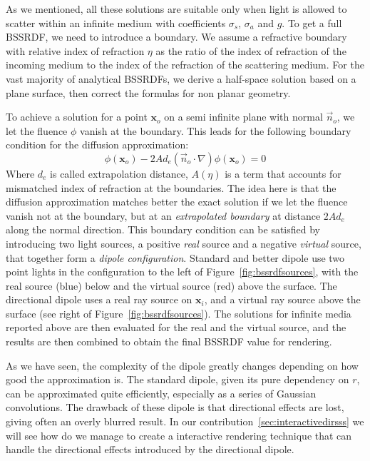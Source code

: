 %
As we mentioned, all these solutions are suitable only when light is allowed to scatter within an infinite medium with coefficients $\sigma_s$, $\sigma_a$ and $g$. To get a full BSSRDF, we need to introduce a boundary. We assume a refractive boundary with relative index of refraction $\eta$ as the ratio of the index of refraction of the incoming medium to the index of the refraction of the scattering medium. For the vast majority of analytical BSSRDFs, we derive a half-space solution based on a plane surface, then correct the formulas for non planar geometry.

To achieve a solution for a point $\mathbf{x}_o$ on a semi infinite plane with normal $\vec{n}_o$, we let the fluence $\phi$ vanish at the boundary. This leads for the following boundary condition for the diffusion approximation: 
\begin{equation*}
\phi(\mathbf{x}_o) - 2 A d_e (\vec{n}_o \cdot \nabla) \phi(\mathbf{x}_o) = 0
\end{equation*}
Where $d_e$ is called extrapolation distance, $A(\eta)$ is a term that accounts for mismatched index of refraction at the boundaries. The idea here is that the diffusion approximation matches better the exact solution if we let the fluence vanish not at the boundary, but at an \emph{extrapolated boundary} at distance $2 A d_e$ along the normal direction. This boundary condition can be satisfied by introducing two light sources, a positive \emph{real} source and a negative \emph{virtual} source, that together form a \emph{dipole configuration}.  Standard and better dipole use two point lights in the configuration to the left of Figure~\ref{fig:bssrdfsources}, with the real source (blue) below and the virtual source (red) above the surface. The directional dipole uses a real ray source on $\mathbf{x}_i$, and a virtual ray source above the surface (see right of Figure~\ref{fig:bssrdfsources}). The solutions for infinite media reported above are then evaluated for the real and the virtual source, and the results are then combined to obtain the final BSSRDF value for rendering. 

As we have seen, the complexity of the dipole greatly changes depending on how good the approximation is. The standard dipole, given its pure dependency on $r$, can be approximated quite efficiently, especially as a series of Gaussian convolutions. The drawback of these dipole is that directional effects are lost, giving often an overly blurred result. In our contribution~\ref{sec:interactivedirsss} we will see how do we manage to create a interactive rendering technique that can handle the directional effects introduced by the directional dipole.

